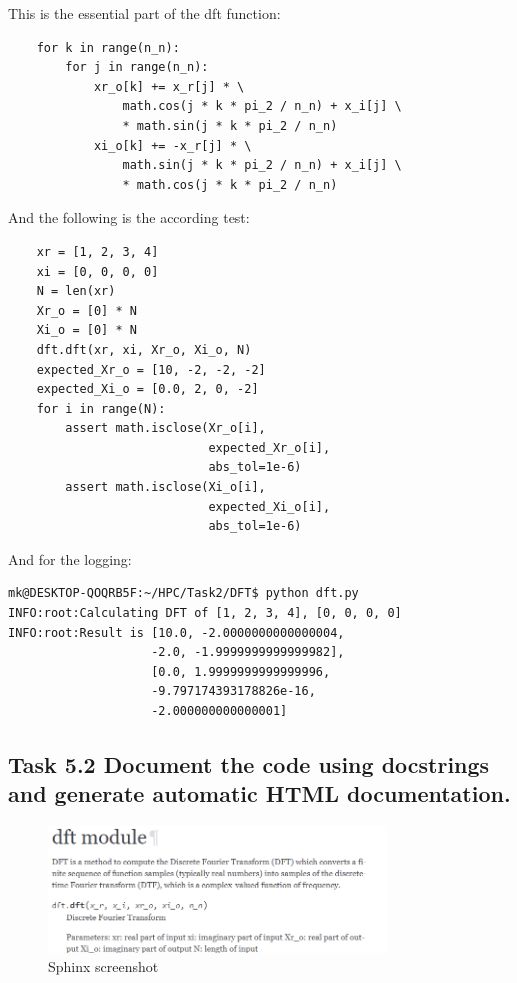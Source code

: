 \documentclass{article}
\begin{document}
This is the essential part of the dft function:


\begin{minipage}{\linewidth}
\begin{verbatim}
    for k in range(n_n):
        for j in range(n_n):
            xr_o[k] += x_r[j] * \
                math.cos(j * k * pi_2 / n_n) + x_i[j] \
                * math.sin(j * k * pi_2 / n_n)
            xi_o[k] += -x_r[j] * \
                math.sin(j * k * pi_2 / n_n) + x_i[j] \
                * math.cos(j * k * pi_2 / n_n)
\end{verbatim}
\end{minipage}

And the following is the according test:


\begin{minipage}{\linewidth}
\begin{lstlisting}
    xr = [1, 2, 3, 4]
    xi = [0, 0, 0, 0]
    N = len(xr)
    Xr_o = [0] * N
    Xi_o = [0] * N
    dft.dft(xr, xi, Xr_o, Xi_o, N)
    expected_Xr_o = [10, -2, -2, -2]
    expected_Xi_o = [0.0, 2, 0, -2]
    for i in range(N):
        assert math.isclose(Xr_o[i], 
                            expected_Xr_o[i], 
                            abs_tol=1e-6)
        assert math.isclose(Xi_o[i], 
                            expected_Xi_o[i], 
                            abs_tol=1e-6)
\end{lstlisting}
\end{minipage}


And for the logging:


\begin{minipage}{\linewidth}
\begin{lstlisting}
mk@DESKTOP-QOQRB5F:~/HPC/Task2/DFT$ python dft.py
INFO:root:Calculating DFT of [1, 2, 3, 4], [0, 0, 0, 0]
INFO:root:Result is [10.0, -2.0000000000000004, 
                    -2.0, -1.9999999999999982], 
                    [0.0, 1.9999999999999996, 
                    -9.797174393178826e-16, 
                    -2.000000000000001]
\end{lstlisting}
\end{minipage}

\subsection{Task 5.2 Document the code using docstrings and generate automatic HTML documentation.}

\begin{figure}[h]
\centering
\includegraphics[width=0.8\textwidth]{sphinx_screen.PNG}
\caption{Sphinx screenshot}
\end{figure}
\end{document}
